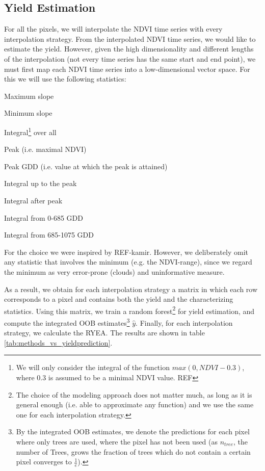 {    \subsection{Yield Estimation}{
        \label{sec:corr_yield_est}
        For all the pixels, we will interpolate the NDVI time series with every interpolation strategy. From the interpolated NDVI time series, we would like to estimate the yield. However, given the high dimensionality and different lengths of the interpolation (not every time series has the same start and end point), we must first map each NDVI time series into a low-dimensional vector space. For this we will use the following statistics:
        \begin{Nitemize}
            \item Maximum slope
            \item Minimum slope
            \item Integral\footnote{\label{note:integral-min} We will only consider the integral of the function $max(0, NDVI - 0.3)$, where $0.3$ is assumed to be a minimal NDVI value. REF} over all
            \item Peak (i.e. maximal NDVI)
            \item Peak GDD (i.e. value at which the peak is attained)
            \item Integral up to the peak
            \item Integral after peak
            \item Integral from 0-685 GDD
            \item Integral from 685-1075 GDD    
        \end{Nitemize}
        For the choice we were inspired by REF-kamir. However, we deliberately omit any statistic that involves the minimum (e.g. the NDVI-range), since we regard the minimum as very error-prone (clouds) and uninformative measure. 
        
        As a result, we obtain for each interpolation strategy a matrix in which each row corresponds to a pixel and contains both the yield and the characterizing statistics.
        Using this matrix, we train a random forest\footnote{The choice of the modeling approach does not matter much, as long as it is general enough (i.e. able to approximate any function) and we use the same one for each interpolation strategy.} for yield estimation, and compute the integrated OOB estimates\footnote{By the integrated OOB estimates, we denote the predictions for each pixel where only trees are used, where the pixel has not been used (as $n_{tree}$, the number of Trees, grows the fraction of trees which do not contain a certain pixel converges to $\frac{1}{e}$).} $\hat y$. Finally, for each interpolation strategy, we calculate the RYEA. The results are shown in table \ref{tab:methods_vs_yieldprediction}.
    }

    
    
    
}




